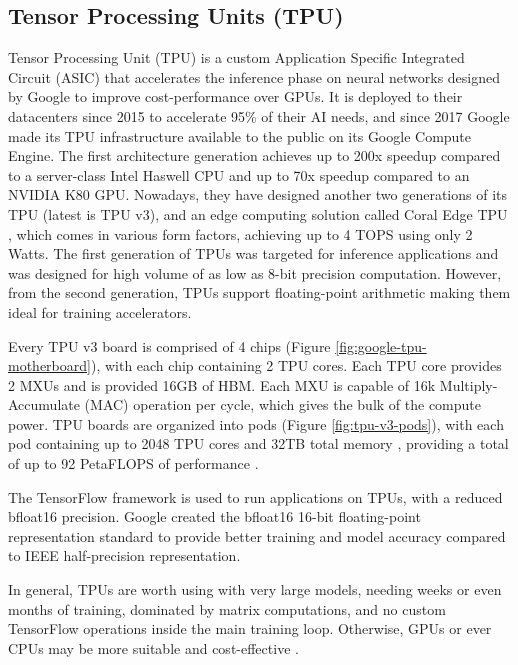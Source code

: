 \subsection{Tensor Processing Units (TPU)}
Tensor Processing Unit (TPU) \cite{In-Datacenter-Performance-Analysis-of-a-Tensor-Processing-Unit} is a custom Application Specific Integrated Circuit (ASIC) that accelerates the inference phase on neural networks designed by Google to improve cost-performance over GPUs. It is deployed to their datacenters since 2015 to accelerate 95\% of their AI needs, and since 2017 Google made its TPU infrastructure available to the public on its Google Compute Engine. The first architecture generation achieves up to 200x speedup compared to a server-class Intel Haswell CPU and up to 70x speedup compared to an NVIDIA K80 GPU. Nowadays, they have designed another two generations of its TPU (latest is TPU v3), and an edge computing solution called Coral Edge TPU \cite{Coral-Edge-TPU}, which comes in various form factors, achieving up to 4 TOPS using only 2 Watts. The first generation of TPUs was targeted for inference applications and was designed for high volume of as low as 8-bit precision computation. However, from the second generation, TPUs support floating-point arithmetic making them ideal for training accelerators.

Every TPU v3 board is comprised of 4 chips (Figure \ref{fig:google-tpu-motherboard}), with each chip containing 2 TPU cores. Each TPU core provides 2 MXUs and is provided 16GB of HBM. Each MXU is capable of 16k Multiply-Accumulate (MAC) operation per cycle, which gives the bulk of the compute power. TPU boards are organized into pods (Figure \ref{fig:tpu-v3-pods}), with each pod containing up to 2048 TPU cores and 32TB total memory \cite{Google-Cloud-TPU}, providing a total of up to 92 PetaFLOPS of performance \cite{Tensor-Processing-Unit-Wikipedia}.

The TensorFlow framework is used to run applications on TPUs, with a reduced bfloat16 precision. Google created the bfloat16 16-bit floating-point representation standard to provide better training and model accuracy compared to IEEE half-precision representation.

In general, TPUs are worth using with very large models, needing weeks or even months of training, dominated by matrix computations, and no custom TensorFlow operations inside the main training loop. Otherwise, GPUs or ever CPUs may be more suitable and cost-effective \cite{Cloud-Tensor-Processing-Units}.

